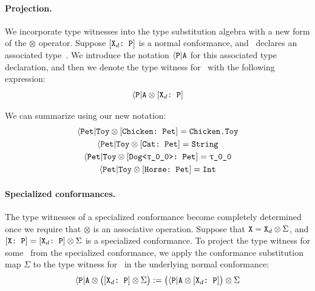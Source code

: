 \documentclass[../generics]{subfiles}
\begin{document}
\paragraph{Projection.}
We incorporate type witnesses into the type substitution algebra with a new form of the $\otimes$ operator. Suppose $[\texttt{$\texttt{X}_d$:~P}]$ is a normal conformance, and \tP\ declares an associated type~\nA. We introduce the notation $\langle\texttt{P}|\texttt{A}$ for this associated type declaration, and then we denote the type witness for \nA\ with the following expression:
\[\langle\texttt{P}|\texttt{A} \otimes [\texttt{$\texttt{X}_d$:~P}]\]

\begin{example}
We can summarize  using our new notation:
\begin{gather*}
\AssocType{Pet}{Toy}\otimes\ConfReq{Chicken}{Pet}=\texttt{Chicken.Toy}\\
\AssocType{Pet}{Toy}\otimes\ConfReq{Cat}{Pet}=\texttt{String}\\
\AssocType{Pet}{Toy}\otimes\ConfReq{Dog<\rT>}{Pet}=\rT\\
\AssocType{Pet}{Toy}\otimes\ConfReq{Horse}{Pet}=\texttt{Int}
\end{gather*}
\end{example}

\paragraph{Specialized conformances.}
The type witnesses of a specialized conformance become completely determined once we require that $\otimes$ is an associative operation. Suppose that $\texttt{X} = \texttt{X}_d \otimes \Sigma$, and $[\texttt{X:~P}]=[\texttt{$\texttt{X}_d$:~P}] \otimes \Sigma$ is a specialized conformance. To project the type witness for some \nA\ from the specialized conformance, we apply the conformance substitution map $\Sigma$ to the type witness for \nA\ in the underlying normal conformance:
\[
\langle\texttt{P}|\texttt{A} \otimes \bigl([\texttt{$\texttt{X}_d$:~P}]\otimes\Sigma\bigr) := \bigl(\langle\texttt{P}|\texttt{A} \otimes[\texttt{$\texttt{X}_d$:~P}]\bigr)\otimes\Sigma
\]
\end{document}
